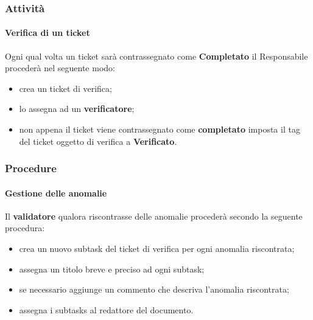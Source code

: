 \subsubsection{Attività}
	\paragraph{Verifica di un ticket}
	Ogni qual volta un ticket sarà contrassegnato come \textbf{Completato} il Responsabile procederà nel seguente modo: 
	\begin{itemize}
		\item crea un ticket di verifica;
		\item lo assegna ad un \textbf{verificatore};
		\item non appena il ticket viene contrassegnato come \textbf{completato} imposta il tag del ticket oggetto di verifica a \textbf{Verificato}.
	\end{itemize}
\subsubsection{Procedure}
	\paragraph{Gestione delle anomalie}
			Il \textbf{validatore} qualora riscontrasse delle anomalie procederà secondo la seguente procedura:
			\begin{itemize}
				\item crea un nuovo subtask del ticket di verifica per ogni anomalia riscontrata;
				\item assegna un titolo breve e preciso ad ogni subtask;
				\item se necessario aggiunge un commento che descriva l'anomalia riscontrata;
				\item assegna i subtasks al redattore del documento.
			\end{itemize}
